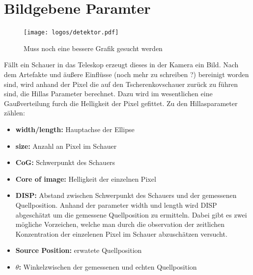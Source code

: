 \section{Bildgebene Paramter}
\begin{figure}[H]
  \centering
  \texttt{[image: logos/detektor.pdf]}
  \caption{Muss noch eine bessere Grafik gesucht werden}
\end{figure}
Fällt ein Schauer in das Teleskop erzeugt dieses in der Kamera ein Bild. Nach dem Artefakte und äußere Einflüsse (noch mehr zu schreiben ?) bereinigt worden sind, wird anhand der Pixel die auf den Tscherenkovschauer zurück zu führen sind, die Hillas Parameter berechnet. Dazu wird im wesentlichen eine Gaußverteilung furch die Helligkeit der Pixel gefittet. Zu den Hillasparameter zählen:
\begin{itemize}
  \item \textbf{width/length:} Hauptachse der Ellipse
  \item \textbf{size:} Anzahl an Pixel im Schauer
  \item \textbf{CoG:} Schwerpunkt des Schauers
  \item \textbf{Core of image:} Helligkeit der einzelnen Pixel
  \item \textbf{DISP:} Abstand zwischen Schwerpunkt des Schauers und der gemessenen Quellposition. Anhand der parameter width und length wird DISP abgeschätzt um die gemessene Quellposition zu ermitteln. Dabei gibt es zwei mögliche Vorzeichen, welche man durch die observation der zeitlichen Konzentration der einzelenen Pixel im Schauer abzuschätzen versucht.
  \item \textbf{Source Position:} erwatete Quellposition
  \item \textbf{$\theta$:} Winkelzwischen der gemessenen und echten Quellposition
\end{itemize}
